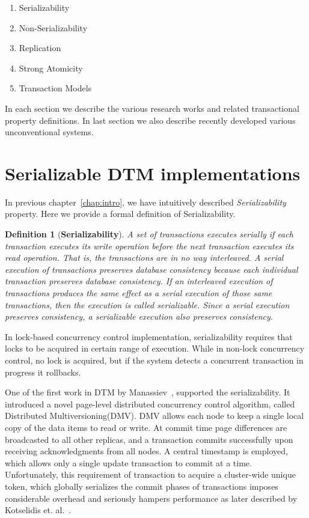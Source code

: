 \documentclass[12pt,english]{report}
\newtheorem{definition}{Definition}[section]
\begin{document}
\begin{enumerate}
\item Serializability
\item Non-Serializability 
\item Replication 
\item Strong Atomicity
\item Transaction Models
\end{enumerate}

In each section we describe the various research works and related transactional property definitions. In last section we also describe recently developed various unconventional systems.

\section{Serializable DTM implementations}

In previous chapter~\ref{chap:intro}, we have intuitively described \textit{Serializability} property. Here we provide a formal definition of Serializability. 

\begin{definition}[\textbf{Serializability}]
A set of transactions executes serially if each transaction executes its write operation before the next transaction executes its read operation. That is, the transactions are in no way interleaved. A serial execution of transactions preserves database consistency because each individual transaction preserves
database consistency. If an interleaved execution of transactions produces the same effect as a serial execution of those same transactions, then the execution is called serializable. Since a serial execution preserves consistency, a serializable execution also preserves consistency.~\cite{serializabilityFormal}
\end{definition}

In lock-based concurrency control implementation, serializability requires that locks to be acquired in certain range of execution. While in non-lock concurrency control, no lock is acquired, but if the system detects a concurrent transaction in progress it rollbacks.

One of the first work in DTM by Manassiev~\cite{Manassiev:2006:EDV:1122971.1123002}, supported the serializability. It introduced a novel page-level distributed concurrency control algorithm, called Distributed Multiversioning(DMV). DMV allows each node to keep a single local copy of the data items to read or write. At commit time page differences are broadcasted to all other replicas, and a transaction commits successfully upon receiving acknowledgments from all nodes. A central timestamp is employed, which allows only a single update transaction to commit at a time. Unfortunately, this requirement of transaction to acquire a cluster-wide unique token, which globally serializes the commit phases of transactions imposes considerable overhead and seriously hampers performance as later described by Kotselidis et. al.~\cite{Kotselidis08distm:a}.
\end{document}
